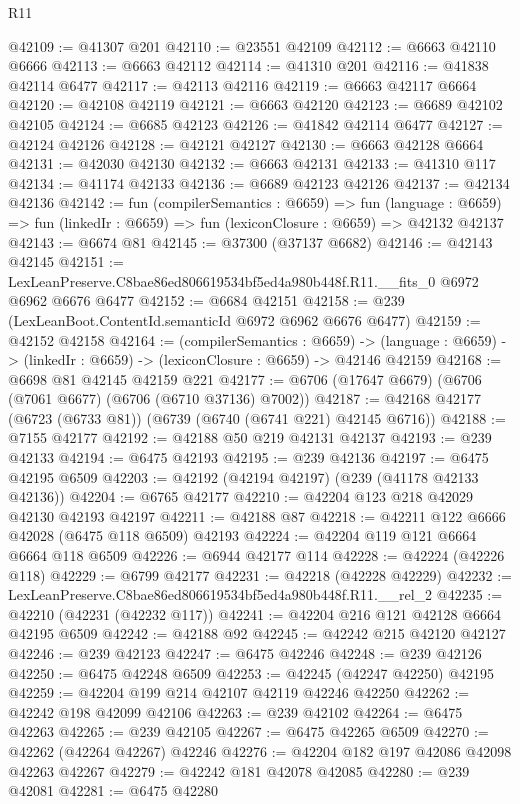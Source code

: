 \begin{lexlean}{R11}
\begin{coremodule}
@42109 := @41307 @201
@42110 := @23551 @42109
@42112 := @6663 @42110 @6666
@42113 := @6663 @42112
@42114 := @41310 @201
@42116 := @41838 @42114 @6477
@42117 := @42113 @42116
@42119 := @6663 @42117 @6664
@42120 := @42108 @42119
@42121 := @6663 @42120
@42123 := @6689 @42102 @42105
@42124 := @6685 @42123
@42126 := @41842 @42114 @6477
@42127 := @42124 @42126
@42128 := @42121 @42127
@42130 := @6663 @42128 @6664
@42131 := @42030 @42130
@42132 := @6663 @42131
@42133 := @41310 @117
@42134 := @41174 @42133
@42136 := @6689 @42123 @42126
@42137 := @42134 @42136
@42142 := fun (compilerSemantics : @6659) =>
  fun (language : @6659) => fun (linkedIr : @6659) => fun (lexiconClosure : @6659) => @42132 @42137
@42143 := @6674 @81
@42145 := @37300 (@37137 @6682)
@42146 := @42143 @42145
@42151 := LexLeanPreserve.C8bae86ed806619534bf5ed4a980b448f.R11.__fits_0 @6972 @6962 @6676 @6477
@42152 := @6684 @42151
@42158 := @239 (LexLeanBoot.ContentId.semanticId @6972 @6962 @6676 @6477)
@42159 := @42152 @42158
@42164 := (compilerSemantics : @6659) ->
  (language : @6659) -> (linkedIr : @6659) -> (lexiconClosure : @6659) -> @42146 @42159
@42168 := @6698 @81 @42145 @42159 @221
@42177 := @6706 (@17647 @6679) (@6706 (@7061 @6677) (@6706 (@6710 @37136) @7002))
@42187 := @42168 @42177 (@6723 (@6733 @81)) (@6739 (@6740 (@6741 @221) @42145 @6716))
@42188 := @7155 @42177
@42192 := @42188 @50 @219 @42131 @42137
@42193 := @239 @42133
@42194 := @6475 @42193
@42195 := @239 @42136
@42197 := @6475 @42195 @6509
@42203 := @42192 (@42194 @42197) (@239 (@41178 @42133 @42136))
@42204 := @6765 @42177
@42210 := @42204 @123 @218 @42029 @42130 @42193 @42197
@42211 := @42188 @87
@42218 := @42211 @122 @6666 @42028 (@6475 @118 @6509) @42193
@42224 := @42204 @119 @121 @6664 @6664 @118 @6509
@42226 := @6944 @42177 @114
@42228 := @42224 (@42226 @118)
@42229 := @6799 @42177
@42231 := @42218 (@42228 @42229)
@42232 := LexLeanPreserve.C8bae86ed806619534bf5ed4a980b448f.R11.__rel_2
@42235 := @42210 (@42231 (@42232 @117))
@42241 := @42204 @216 @121 @42128 @6664 @42195 @6509
@42242 := @42188 @92
@42245 := @42242 @215 @42120 @42127
@42246 := @239 @42123
@42247 := @6475 @42246
@42248 := @239 @42126
@42250 := @6475 @42248 @6509
@42253 := @42245 (@42247 @42250) @42195
@42259 := @42204 @199 @214 @42107 @42119 @42246 @42250
@42262 := @42242 @198 @42099 @42106
@42263 := @239 @42102
@42264 := @6475 @42263
@42265 := @239 @42105
@42267 := @6475 @42265 @6509
@42270 := @42262 (@42264 @42267) @42246
@42276 := @42204 @182 @197 @42086 @42098 @42263 @42267
@42279 := @42242 @181 @42078 @42085
@42280 := @239 @42081
@42281 := @6475 @42280

\end{coremodule}
\end{lexlean}
